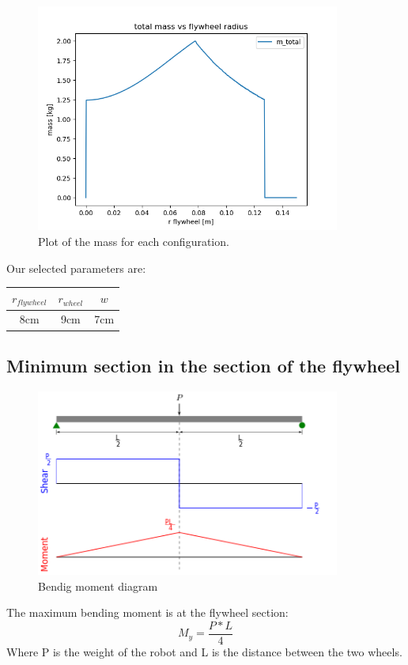 \begin{figure}[H]
	\centering
	\includegraphics[width=10cm]{img/optimization/mass.png}
	\caption{Plot of the mass for each configuration.}
	\label{fig:Mass plot}
\end{figure}

Our selected parameters are:
\begin{center}
	\begin{tabular}{ |c|c|c| } 
	 \hline
	 $r_{flywheel}$ & $r_{wheel}$ & $w$ \\
	 \hline 
	 8cm & 9cm & 7cm \\ 
	 \hline
	\end{tabular}
	\end{center}

\subsection{Minimum section in the section of the flywheel}
\begin{figure}[ht]
	\centering
	\includegraphics[width=10cm]{img/Shear_Moment_Diagram.png}
	\caption{Bendig moment diagram}
	\label{fig:Bendig moment diagram}
\end{figure}
The maximum bending moment is at the flywheel section:
\[M_y = \frac{P * L}{4}\]
Where P is the weight of the robot and L is the distance between the two wheels.

